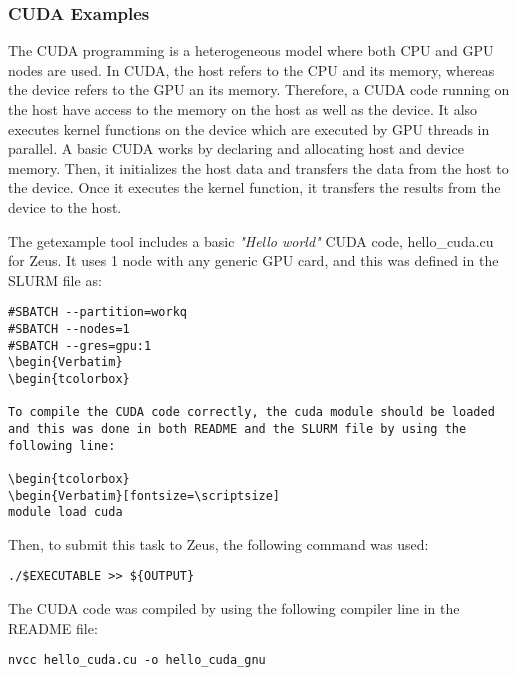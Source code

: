 \subsubsection{CUDA Examples}

The CUDA programming is a heterogeneous model where both CPU and GPU nodes are used. In CUDA, the host refers to the CPU and its memory, whereas the 
device refers to the GPU an its memory. Therefore, a CUDA code running on the host have access to the memory on the host as well as the device. It also 
executes kernel functions on the device which are executed by GPU threads in parallel. A basic CUDA works by declaring and allocating host and device 
memory. Then, it initializes the host data and transfers the data from the host to the device. Once it executes the kernel function, it transfers the 
results from the device to the host.

The getexample tool includes a basic \emph{"Hello world"} CUDA code, hello\_cuda.cu for Zeus. It uses 1 node with any generic GPU card, and this was 
defined in the SLURM file as:

\begin{tcolorbox}
\begin{Verbatim}[fontsize=\scriptsize]
#SBATCH --partition=workq
#SBATCH --nodes=1
#SBATCH --gres=gpu:1
\begin{Verbatim}
\begin{tcolorbox}

To compile the CUDA code correctly, the cuda module should be loaded and this was done in both README and the SLURM file by using the following line:

\begin{tcolorbox}
\begin{Verbatim}[fontsize=\scriptsize]
module load cuda
\end{Verbatim}
\end{tcolorbox}

Then, to submit this task to Zeus, the following command was used:

\begin{tcolorbox}
\begin{Verbatim}[fontsize=\scriptsize]
./$EXECUTABLE >> ${OUTPUT}
\end{Verbatim}
\end{tcolorbox}

The CUDA code was compiled by using the following compiler line in the README file:

\begin{tcolorbox}
\begin{Verbatim}[fontsize=\scriptsize]
nvcc hello_cuda.cu -o hello_cuda_gnu
\end{Verbatim}
\end{tcolorbox}
